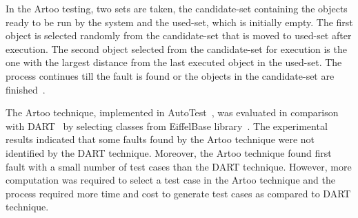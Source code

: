In the Artoo testing, two sets are taken, the candidate-set containing the objects ready to be run by the system and the used-set, which is initially empty. The first object is selected randomly from the candidate-set that is moved to used-set after execution. The second object selected from the candidate-set for execution is the one with the largest distance from the last executed object in the used-set. The process continues till the fault is found or the objects in the candidate-set are finished~\cite{ciupa2006object}.

The Artoo technique, implemented in AutoTest~\cite{ciupa2008artoo}, was evaluated in comparison with DART~\cite{godefroid2005dart} by selecting classes from EiffelBase library~\cite{meyer1987eiffel}. The experimental results indicated that some faults found by the Artoo technique were not identified by the DART technique. Moreover, the Artoo technique found first fault with a small number of test cases than the DART technique. However, more computation was required to select a test case in the Artoo technique and the process required more time and cost to generate test cases as compared to DART technique.


